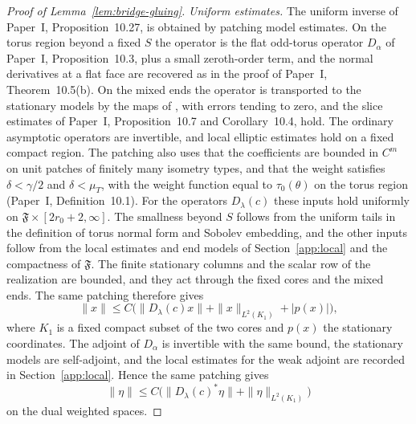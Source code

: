 \documentclass[11pt]{amsart}
\theoremstyle{definition}
\theoremstyle{remark}
\theoremstyle{plain}
\numberwithin{equation}{section}
\begin{document}
\begin{proof}[Proof of Lemma~\ref{lem:bridge-gluing}]
\emph{Uniform estimates.} The uniform inverse of Paper~I,
Proposition~10.27, is obtained by patching model
estimates. On the torus region beyond a fixed $S$ the operator is the flat
odd-torus operator $D_\alpha$ of Paper~I, Proposition~10.3, plus a small
zeroth-order term, and the normal derivatives at a flat face are recovered
as in the proof of Paper~I, Theorem~10.5(b). On the mixed ends the operator
is transported to the stationary models by the maps of
\cite[Proposition~5.27]{DFL-mixed}, with errors tending to zero, and the
slice estimates of Paper~I, Proposition~10.7 and Corollary~10.4, hold. The
ordinary asymptotic operators are invertible, and local elliptic estimates
hold on a fixed compact region. The patching also uses that the
coefficients are bounded in $C^m$ on unit patches of finitely many isometry
types, and that the weight satisfies $\delta<\gamma/2$ and $\delta<\mu_T$,
with the weight function equal to $\tau_0(\theta)$ on the torus region (Paper~I, Definition~10.1). For the operators
$D_\lambda(c)$ these inputs hold uniformly on
$\mathfrak F\times[2r_0+2,\infty]$. The smallness beyond $S$ follows from
the uniform tails in the definition of torus normal form and Sobolev
embedding, and the other inputs follow from the local estimates and end
models of Section~\ref{app:local} and the compactness of $\mathfrak F$. The
finite stationary columns and the scalar row of the realization are
bounded, and they act through the fixed cores and the mixed ends. The same
patching therefore gives
\[
 \|x\|\le C\bigl(\|D_\lambda(c)x\|+\|x\|_{L^2(K_1)}+|p(x)|\bigr),
\]
where $K_1$ is a fixed compact subset of the two cores and $p(x)$ the
stationary coordinates. The adjoint of $D_\alpha$ is invertible with the
same bound, the stationary models are self-adjoint, and the local
estimates for the weak adjoint are recorded in
Section~\ref{app:local}. Hence the same patching gives
\[
 \|\eta\|\le C\bigl(\|D_\lambda(c)^*\eta\|+\|\eta\|_{L^2(K_1)}\bigr)
\]
on the dual weighted spaces.


\end{proof}
\end{document}
